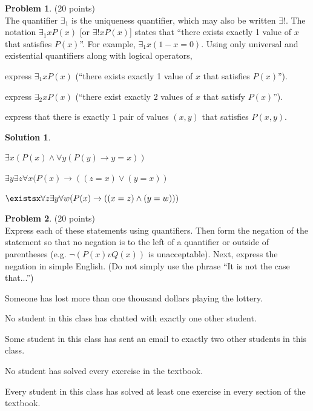 \documentclass{article}
\theoremstyle{definition}
\newtheorem{problem}{Problem}
\newtheorem*{solution}{Solution}
\begin{document}
\newpage

\begin{problem} (20 points)\\
The quantifier $\exists_1$ is the uniqueness quantifier, which may also be written $\exists!$.  The notation $\exists_1x P(x)$ [or $\exists!x P(x)$] states that ``there exists exactly 1 value of $x$ that satisfies $P(x)$''.  For example, $\exists_1x (1-x=0)$.  Using only universal and existential quantifiers along with logical operators,
\begin{compactenum}
\item express $\exists_1x P(x)$ (``there exists exactly 1 value of $x$ that satisfies $P(x)$'').
\item express $\exists_2x P(x)$ (``there exist exactly 2 values of $x$ that satisfy $P(x)$'').
\item express that there is exactly 1 pair of values $(x,y)$ that satisfies $P(x,y)$.
\end{compactenum}
\end{problem}

\begin{solution}\ \\
\begin{compactenum}
\item $\exists x( P(x) \wedge \forall y (P(y) \to y = x))$\ \\
\item $\exists y \exists z \forall x (P(x) \to ((z=x) \vee (y = x))$\  \\
\item $\existsx\forall z \exists y \forall w (P(x) \to ((x=z) \wedge (y=w))) $\ \\ 

\end{compactenum}
\end{solution}

\newpage

\begin{problem} (20 points)\\
Express each of these statements using quantifiers. Then form the negation of the statement so that no negation is to the left of a quantifier or outside of parentheses (e.g. $\neg (P(x) v Q(x))$ is unacceptable).  Next, express the negation in simple English. (Do not simply use the phrase ``It is not the case that...'')
\begin{compactenum}
\item Someone has lost more than one thousand dollars playing the lottery.
\item No student in this class has chatted with exactly one other student.
\item Some student in this class has sent an email to exactly two other students in this class.
\item No student has solved every exercise in the textbook.
\item Every student in this class has solved at least one exercise in every section of the textbook.
\end{compactenum}
\end{problem}
\end{document}

